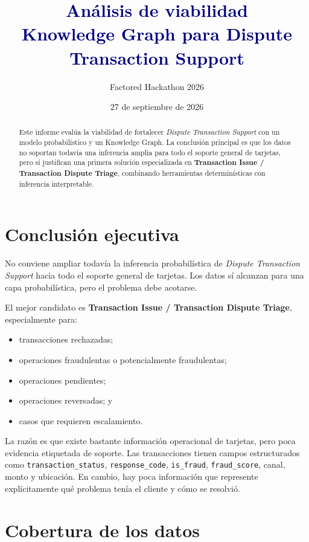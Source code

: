 \documentclass[11pt,a4paper]{article}
\title{\textcolor{navy}{Análisis de viabilidad\\[2pt] Knowledge Graph para Dispute Transaction Support}}
\author{Factored Hackathon 2026}
\date{27 de septiembre de 2026}
\begin{document}
\maketitle

\begin{abstract}
Este informe evalúa la viabilidad de fortalecer \emph{Dispute Transaction Support} con un modelo probabilístico y un Knowledge Graph. La conclusión principal es que los datos no soportan todavía una inferencia amplia para todo el soporte general de tarjetas, pero sí justifican una primera solución especializada en \textbf{Transaction Issue / Transaction Dispute Triage}, combinando herramientas determinísticas con inferencia interpretable.
\end{abstract}

\section{Conclusión ejecutiva}

No conviene ampliar todavía la inferencia probabilística de \emph{Dispute Transaction Support} hacia todo el soporte general de tarjetas. Los datos sí alcanzan para una capa probabilística, pero el problema debe acotarse.

El mejor candidato es \textbf{Transaction Issue / Transaction Dispute Triage}, especialmente para:

\begin{itemize}
  \item transacciones rechazadas;
  \item operaciones fraudulentas o potencialmente fraudulentas;
  \item operaciones pendientes;
  \item operaciones reversadas; y
  \item casos que requieren escalamiento.
\end{itemize}

La razón es que existe bastante información operacional de tarjetas, pero poca evidencia etiquetada de soporte. Las transacciones tienen campos estructurados como \texttt{transaction\_status}, \texttt{response\_code}, \texttt{is\_fraud}, \texttt{fraud\_score}, canal, monto y ubicación. En cambio, hay poca información que represente explícitamente qué problema tenía el cliente y cómo se resolvió.

\section{Cobertura de los datos}
\end{document}
